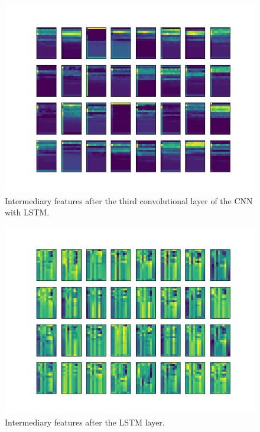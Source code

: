 \documentclass{article}
\begin{document}
\begin{figure}
\includegraphics[scale=0.5]{figs/latent_space_layer3.png}
\caption{Intermediary features after the third convolutional layer of the CNN with LSTM. \label{latent3}}
\end{figure}

\begin{figure}
\includegraphics[scale=0.5]{figs/latent_space_layer4.png}
\caption{Intermediary features after the LSTM layer. \label{latent4}}
\end{figure}
\end{document}
